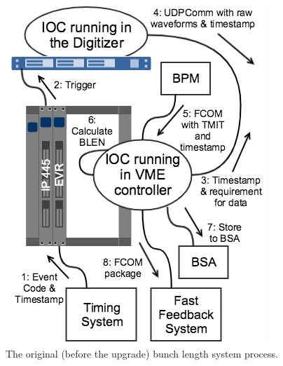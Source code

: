 \documentclass[letter,
        biblatex,   %
        keeplastbox,  %
        ]{jacow}
\begin{document}
\begin{figure}[!htb]
  \centering
  \includegraphics*[width=.8\columnwidth]{BLEN_VME_Process}
  \caption{The original (before the upgrade) bunch length system process.}
  \label{fig:blen_vme}
\end{figure}
\end{document}
